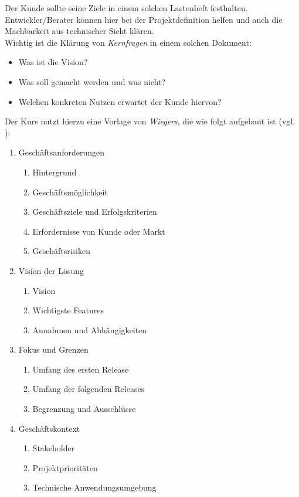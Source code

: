 \noindent
Der Kunde sollte seine Ziele in einem solchen Lastenheft festhalten. \\
Entwickler/Berater können hier bei der Projektdefinition helfen und auch die Machbarkeit aus technischer Sicht klären.\\

\noindent
Wichtig ist die Klärung von \textit{Kernfragen} in einem solchen Dokument:

\begin{itemize}
    \item Was ist die Vision?
    \item Was soll gemacht werden und was nicht?
    \item Welchen konkreten Nutzen erwartet der Kunde hiervon?
\end{itemize}

\noindent
Der Kurs nutzt hierzu eine Vorlage von \textit{Wiegers}, die wie folgt aufgebaut ist (vgl. \cite[81 ff. sowie 576 ff.]{WJ13}):

\begin{tcolorbox}[colback=white]
    \begin{enumerate}
        \item Geschäftsanforderungen
        \begin{enumerate}[label*=\arabic*.]
            \item Hintergrund
            \item Geschäftsmöglichkeit
            \item Geschäftsziele und Erfolgskriterien
            \item Erfordernisse von Kunde oder Markt
            \item Geschäftsrisiken
        \end{enumerate}
        \item Vision der Lösung
        \begin{enumerate}[label*=\arabic*.]
            \item Vision
            \item Wichtigste Features
            \item Annahmen und Abhängigkeiten
        \end{enumerate}
        \item Fokus und Grenzen
        \begin{enumerate}[label*=\arabic*.]
            \item Umfang des ersten Release
            \item Umfang der folgenden Releases
            \item Begrenzung und Ausschlüsse
        \end{enumerate}
        \item Geschäftskontext
        \begin{enumerate}[label*=\arabic*.]
            \item Stakeholder
            \item Projektprioritäten
            \item Technische Anwendungsumgebung
        \end{enumerate}
    \end{enumerate}
\end{tcolorbox}


